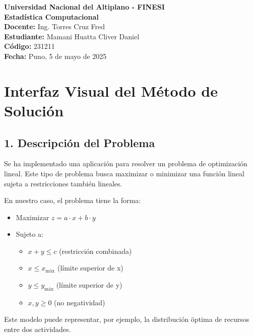 \documentclass[a4paper,10pt]{article}
\begin{document}
\begin{center}
    \textbf{\Large Universidad Nacional del Altiplano - FINESI} \\[1em]
    \textbf{\large Estadística Computacional} \\[1em]
    
    \textbf{Docente:} Ing. Torres Cruz Fred \\
    \textbf{Estudiante:} Mamani Huatta Cliver Daniel \\
    \textbf{Código:} 231211 \\[2em]
    
    \textbf{Fecha:} Puno, 5 de mayo de 2025
\end{center}

\vspace{1em} 


\section*{Interfaz Visual del M\'etodo de Soluci\'on}

\subsection*{1. Descripci\'on del Problema}
Se ha implementado una aplicaci\'on para resolver un problema de optimizaci\'on lineal. Este tipo de problema busca maximizar o minimizar una funci\'on lineal sujeta a restricciones tambi\'en lineales.

En nuestro caso, el problema tiene la forma:
\begin{itemize}
  \item Maximizar $z = a \cdot x + b \cdot y$
  \item Sujeto a:
  \begin{itemize}
    \item $x + y \leq c$ (restricci\'on combinada)
    \item $x \leq x_{\text{m\'ax}}$ (l\'imite superior de x)
    \item $y \leq y_{\text{m\'ax}}$ (l\'imite superior de y)
    \item $x, y \geq 0$ (no negatividad)
  \end{itemize}
\end{itemize}
Este modelo puede representar, por ejemplo, la distribuci\'on \"optima de recursos entre dos actividades.
\end{document}
